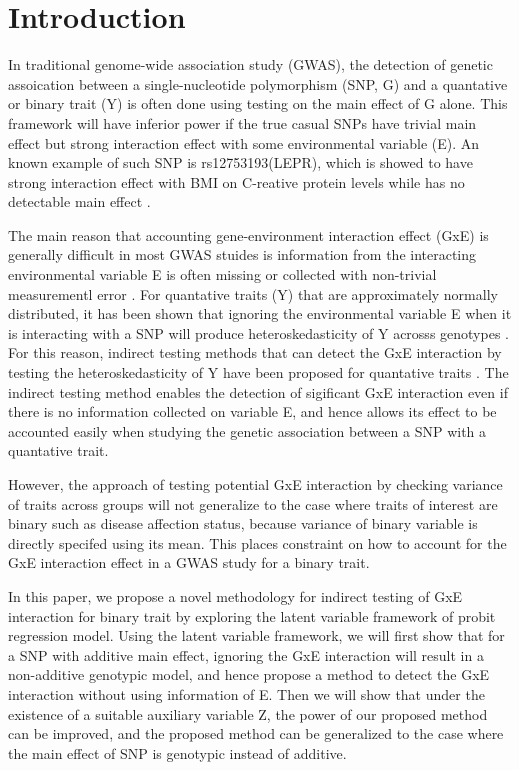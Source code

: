 
\section{Introduction}\label{sec:intro}

In traditional genome-wide association study (GWAS), the detection of genetic assoication between a single-nucleotide polymorphism (SNP, G) and a quantative or binary trait (Y) is often done using testing on the main effect of G alone. This framework will have inferior power if the true casual SNPs have trivial main effect but strong interaction effect with some environmental variable (E). An known example of such SNP is rs12753193(LEPR), which is showed to have strong interaction effect with BMI on C-reative protein levels while has no detectable main effect \citep{lepr}. 

The main reason that accounting gene-environment interaction effect (GxE) is generally difficult in most GWAS stuides is information from the interacting environmental variable E is often missing or collected with non-trivial measurementl error \citep{jlst}. For quantative traits (Y) that are approximately normally distributed, it has been shown that ignoring the environmental variable E when it is interacting with a SNP will produce heteroskedasticity of Y acrosss genotypes \citep{lepr}. For this reason, indirect testing methods that can detect the GxE interaction by testing the heteroskedasticity of Y have been proposed for quantative traits \citep{jlst,gjlst}. The indirect testing method enables the detection of sigificant GxE interaction even if there is no information collected on variable E, and hence allows its effect to be accounted easily when studying the genetic association between a SNP with a quantative trait.

However, the approach of testing potential GxE interaction by checking variance of traits across groups will not generalize to the case where traits of interest are binary such as disease affection status, because variance of binary variable is directly specifed using its mean. This places constraint on how to account for the GxE interaction effect in a GWAS study for a binary trait.

In this paper, we propose a novel methodology for indirect testing of GxE interaction for binary trait by exploring the latent variable framework of probit regression model. Using the latent variable framework, we will first show that for a SNP with additive main effect, ignoring the GxE interaction will result in a non-additive genotypic model, and hence propose a method to detect the GxE interaction without using information of E. Then we will show that under the existence of a suitable auxiliary variable Z, the power of our proposed method can be improved, and the proposed method can be generalized to the case where the main effect of SNP is genotypic instead of additive. 

